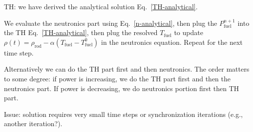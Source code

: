 \documentclass{school-22.211-notes}
\begin{document}
TH: we have derived the analytical solution Eq.~\ref{TH-analytical}.


We evaluate the neutronics part using Eq.~\ref{n-analytical}, then plug the $P_{\mathrm{fuel}}^{n+1}$ into the TH Eq.~\ref{TH-analytical}, then plug the resolved $T_{\mathrm{fuel}}$ to update $\rho(t) = \rho_{\mathrm{rod}} - \alpha (T_{\mathrm{fuel}} - T_{\mathrm{fuel}}^0)$ in the neutronics equation. Repeat for the next time step. 

Alternatively we can do the TH part first and then neutronics. The order matters to some degree: if power is increasing, we do the TH part first and then the neutronics part. If power is decreasing, we do neutronics portion first then TH part. 

Issue: solution requires very small time steps or synchronization iterations (e.g., another iteration?). 
\end{document}
